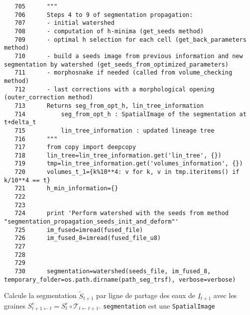 \documentclass{article}
\def \mycolor {red}
\begin{document}
\begin{verbatim}  
   705	    """
   706	    Steps 4 to 9 of segmentation propagation:
   707	    - initial watershed
   708	    - computation of h-minima (get_seeds method)
   709	    - optimal h selection for each cell (get_back_parameters method)
   710	    - build a seeds image from previous information and new segmentation by watershed (get_seeds_from_optimized_parameters)
   711	    - morphosnake if needed (called from volume_checking method)
   712	    - last corrections with a morphological opening (outer_correction method)
   713	    Returns seg_from_opt_h, lin_tree_information
   714	        seg_from_opt_h : SpatialImage of the segmentation at t+delta_t
   715	        lin_tree_information : updated lineage tree 
   716	    """
   717	    from copy import deepcopy
   718	    lin_tree=lin_tree_information.get('lin_tree', {})
   719	    tmp=lin_tree_information.get('volumes_information', {})
   720	    volumes_t_1={k%10**4: v for k, v in tmp.iteritems() if k/10**4 == t}
   721	    h_min_information={}
   722	    
   723	
   724	    print 'Perform watershed with the seeds from method "segmentation_propagation_seeds_init_and_deform"'
   725	    im_fused=imread(fused_file)
   726	    im_fused_8=imread(fused_file_u8)
   727	
   728	
   729	
   730	    segmentation=watershed(seeds_file, im_fused_8, temporary_folder=os.path.dirname(path_seg_trsf), verbose=verbose)
\end{verbatim} 
\color{\mycolor}
Calcule la segmentation $\tilde{S}_{t+1}$ par ligne de partage des eaux de $I_{t+1}$ avec les graines $S^e_{t+1 \leftarrow t} = S^e_t \circ \mathcal{T}_{t \leftarrow t+1}$. \verb|segmentation| est une \texttt{SpatialImage}
\end{document}
